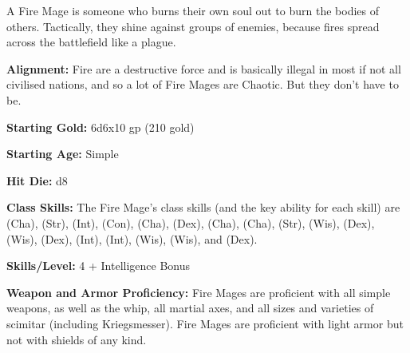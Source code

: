 
A Fire Mage is someone who burns their own soul out to burn the bodies of others. Tactically, they shine against groups of enemies, because fires spread across the battlefield like a plague.

\textbf{Alignment:} Fire are a destructive force and is basically illegal in most if not all civilised nations, and so a lot of Fire Mages are Chaotic. But they don't have to be.

\textbf{Starting Gold:} 6d6x10 gp (210 gold)

\textbf{Starting Age:} Simple

\textbf{Hit Die:} d8

\textbf{Class Skills:} The Fire Mage's class skills (and the key ability for each skill) are  (Cha),  (Str),  (Int),  (Con),  (Cha),  (Dex),  (Cha),  (Cha),  (Str),  (Wis),  (Dex),  (Wis),  (Dex),  (Int),  (Int),  (Wis),  (Wis), and  (Dex).

\textbf{Skills/Level:} 4 + Intelligence Bonus

\modebab{}
\goodfor{}
\poorref{}
\poorwil{}

\begin{classtable}
\end{classtable}

\classfeatures

\textbf{Weapon and Armor Proficiency:} Fire Mages are proficient with all simple weapons, as well as the whip, all martial axes, and all sizes and varieties of scimitar (including Kriegsmesser). Fire Mages are proficient with light armor but not with shields of any kind.

